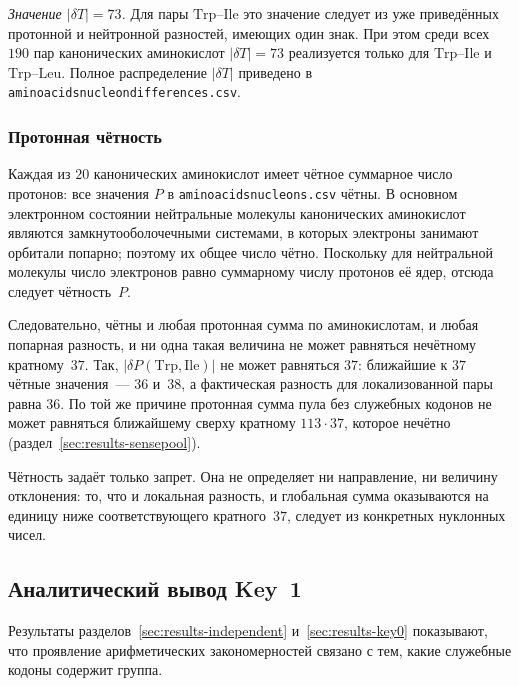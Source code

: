 \documentclass[11pt,a4paper]{article}
\renewcommand{\_}{\origunderscore\allowbreak}
\begin{document}
\emph{Значение $|\delta T| = 73$.} Для пары
$\mathrm{Trp}$--$\mathrm{Ile}$ это значение следует из уже
приведённых протонной и нейтронной разностей, имеющих один знак.
При этом среди всех $190$ пар канонических аминокислот
$|\delta T| = 73$ реализуется только для
$\mathrm{Trp}$--$\mathrm{Ile}$ и
$\mathrm{Trp}$--$\mathrm{Leu}$. Полное распределение
$|\delta T|$ приведено в
\texttt{amino\_acids\_nucleon\_differences.csv}.

\subsubsection{Протонная чётность}
\label{sec:results-proton-parity}

Каждая из $20$ канонических аминокислот имеет чётное суммарное число
протонов: все значения $P$ в
\texttt{amino\_acids\_nucleons.csv} чётны. В основном электронном
состоянии нейтральные молекулы канонических аминокислот являются
замкнутооболочечными системами, в которых электроны занимают
орбитали попарно; поэтому их общее число чётно. Поскольку для
нейтральной молекулы число электронов равно суммарному числу протонов
её ядер, отсюда следует чётность~$P$.

Следовательно, чётны и любая протонная сумма по аминокислотам, и любая
попарная разность, и ни одна такая величина не может равняться
нечётному кратному~$37$. Так, $|\delta P(\mathrm{Trp},\mathrm{Ile})|$
не может равняться $37$: ближайшие к $37$ чётные значения~--- $36$
и~$38$, а фактическая разность для локализованной пары равна $36$.
По той же причине протонная сумма пула без служебных кодонов не может
равняться ближайшему сверху кратному $113 \cdot 37$, которое нечётно
(раздел~\ref{sec:results-sensepool}).

Чётность задаёт только запрет. Она не определяет ни направление, ни
величину отклонения: то, что и локальная разность, и глобальная сумма
оказываются на единицу ниже соответствующего кратного~$37$, следует
из конкретных нуклонных чисел.

\subsection{Аналитический вывод Key~1}
\label{sec:results-key1-derivation}

Результаты разделов~\ref{sec:results-independent}
и~\ref{sec:results-key0} показывают, что проявление
арифметических закономерностей связано с тем, какие
служебные кодоны содержит группа.
\end{document}
